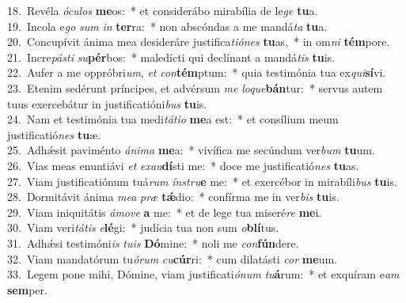 {18.~}Revéla \textit{ó}\textit{cu}\textit{los} \textbf{me}os:~* et considerábo mirabília de le\textit{ge} \textbf{tu}a.\\
{19.~}Incola e\textit{go} \textit{sum} \textit{in} \textbf{ter}ra:~* non abscóndas a me mandá\textit{ta} \textbf{tu}a.\\
{20.~}Concupívit ánima mea desideráre justifica\textit{ti}\textit{ó}\textit{nes} \textbf{tu}as,~* in om\textit{ni} \textbf{tém}pore.\\
{21.~}Incre\textit{pá}\textit{sti} \textit{su}\textbf{pér}bos:~* maledícti qui declínant a mandá\textit{tis} \textbf{tu}is.\\
{22.~}Aufer a me oppróbri\textit{um}, \textit{et} \textit{con}\textbf{tém}ptum:~* quia testimónia tua ex\textit{qui}\textbf{sí}vi.\\
{23.~}Etenim sedérunt príncipes, et advérsum \textit{me} \textit{lo}\textit{que}\textbf{bán}tur:~* servus autem tuus exercebátur in justificatióni\textit{bus} \textbf{tu}is.\\
{24.~}Nam et testimónia tua medi\textit{tá}\textit{ti}\textit{o} \textbf{me}a est:~* et consílium meum justificatió\textit{nes} \textbf{tu}æ.\\
{25.~}Adhǽsit paviménto \textit{á}\textit{ni}\textit{ma} \textbf{me}a:~* vivífica me secúndum ver\textit{bum} \textbf{tu}um.\\
{26.~}Vias meas enuntiávi \textit{et} \textit{e}\textit{xau}\textbf{dí}sti me:~* doce me justificatió\textit{nes} \textbf{tu}as.\\
{27.~}Viam justificatiónum tuá\textit{rum} \textit{ín}\textit{stru}\textbf{e} me:~* et exercébor in mirabíli\textit{bus} \textbf{tu}is.\\
{28.~}Dormitávit ánima \textit{me}\textit{a} \textit{præ} \textbf{tǽ}dio:~* confírma me in ver\textit{bis} \textbf{tu}is.\\
{29.~}Viam iniquitátis \textit{á}\textit{mo}\textit{ve} \textbf{a} me:~* et de lege tua miseré\textit{re} \textbf{me}i.\\
{30.~}Viam veri\textit{tá}\textit{tis} \textit{e}\textbf{lé}gi:~* judícia tua non sum \textit{o}\textbf{blí}tus.\\
{31.~}Adhǽsi testimóni\textit{is} \textit{tu}\textit{is} \textbf{Dó}mine:~* noli me \textit{con}\textbf{fún}dere.\\
{32.~}Viam mandatórum tu\textit{ó}\textit{rum} \textit{cu}\textbf{cúr}ri:~* cum dilatásti \textit{cor} \textbf{me}um.\\
{33.~}Legem pone mihi, Dómine, viam justificati\textit{ó}\textit{num} \textit{tu}\textbf{á}rum:~* et exquíram e\textit{am} \textbf{sem}per.\\

